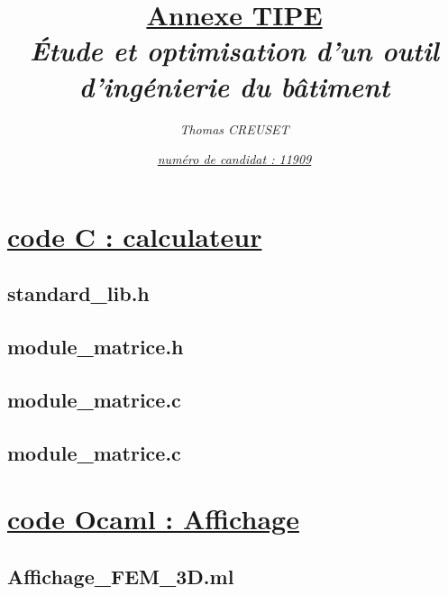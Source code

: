 \documentclass[10px]{article}
\author{\textit{Thomas CREUSET}}
\title{\uline{Annexe TIPE}\\\textit{\'Etude et optimisation d’un outil d'ing\'enierie du b\^atiment}}
\date{\underline{\textit{num\'ero de candidat : 11909}}}
\begin{document}
	
	\maketitle
	
	\tableofcontents
	
	\newpage	
	
	\section{\uline{code C : calculateur}}
	
		\subsection{standard\_lib.h}	
			
	
		\subsection{module\_matrice.h}
			

		\subsection{module\_matrice.c}
			
	
		\subsection{module\_matrice.c}
			
	
	\newpage	
	
	\section{\uline{code Ocaml : Affichage}}
	
		\subsection{Affichage\_FEM\_3D.ml}	
			
\end{document}
